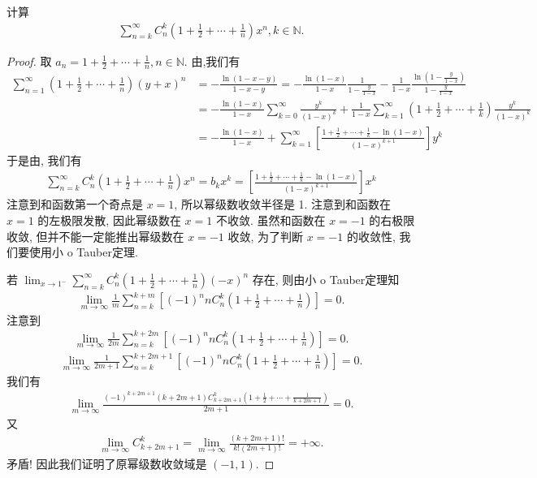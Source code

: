 \documentclass[../../main.tex]{subfiles}
\begin{document}
\begin{example}
计算
\begin{align*}
\sum_{n=k}^{\infty} C_n^k \left(1 + \frac{1}{2} + \cdots + \frac{1}{n}\right) x^n, k \in \mathbb{N}. 
\end{align*}
\end{example}
\begin{proof}
取 $a_n = 1 + \frac{1}{2} + \cdots + \frac{1}{n}, n \in \mathbb{N}$. 由,我们有
\begin{align*}
\sum_{n=1}^{\infty} \left(1 + \frac{1}{2} + \cdots + \frac{1}{n}\right) (y + x)^n &= -\frac{\ln(1 - x - y)}{1 - x - y} = -\frac{\ln(1 - x)}{1 - x} \frac{1}{1 - \frac{y}{1 - x}} - \frac{1}{1 - x} \frac{\ln\left(1 - \frac{y}{1 - x}\right)}{1 - \frac{y}{1 - x}} \\
&= -\frac{\ln(1 - x)}{1 - x} \sum_{k=0}^{\infty} \frac{y^k}{(1 - x)^k} + \frac{1}{1 - x} \sum_{k=1}^{\infty} \left(1 + \frac{1}{2} + \cdots + \frac{1}{k}\right) \frac{y^k}{(1 - x)^k} \\
&= -\frac{\ln(1 - x)}{1 - x} + \sum_{k=1}^{\infty} \left[\frac{1 + \frac{1}{2} + \cdots + \frac{1}{k} - \ln(1 - x)}{(1 - x)^{k + 1}}\right] y^k
\end{align*}
于是由, 我们有
\begin{align*}
\sum_{n=k}^{\infty} C_n^k \left(1 + \frac{1}{2} + \cdots + \frac{1}{n}\right) x^n = b_k x^k = \left[\frac{1 + \frac{1}{2} + \cdots + \frac{1}{k} - \ln(1 - x)}{(1 - x)^{k + 1}}\right] x^k 
\end{align*}
注意到和函数第一个奇点是 $x = 1$, 所以幂级数收敛半径是 1. 注意到和函数在 $x = 1$ 的左极限发散, 因此幂级数在 $x = 1$ 不收敛. 虽然和函数在 $x = -1$ 的右极限收敛, 但并不能一定能推出幂级数在 $x = -1$ 收敛, 为了判断 $x = -1$ 的收敛性, 我们要使用小 o Tauber定理.

若 $\lim_{x \to 1^-} \sum_{n=k}^{\infty} C_n^k \left(1 + \frac{1}{2} + \cdots + \frac{1}{n}\right) (-x)^n$ 存在, 则由小 o Tauber定理知
\begin{align*}
\lim_{m \to \infty} \frac{1}{m} \sum_{n=k}^{k + m} \left[(-1)^n n C_n^k \left(1 + \frac{1}{2} + \cdots + \frac{1}{n}\right)\right] = 0 .
\end{align*}
注意到
\begin{align*}
\lim_{m \to \infty} \frac{1}{2m} \sum_{n=k}^{k + 2m} \left[(-1)^n n C_n^k \left(1 + \frac{1}{2} + \cdots + \frac{1}{n}\right)\right] = 0.
\end{align*}
\begin{align*}
\lim_{m \to \infty} \frac{1}{2m + 1} \sum_{n=k}^{k + 2m + 1} \left[(-1)^n n C_n^k \left(1 + \frac{1}{2} + \cdots + \frac{1}{n}\right)\right] = 0 .
\end{align*}
我们有
\begin{align*}
\lim_{m \to \infty} \frac{(-1)^{k + 2m + 1} (k + 2m + 1) C_{k + 2m + 1}^k \left(1 + \frac{1}{2} + \cdots + \frac{1}{k + 2m + 1}\right)}{2m + 1} = 0.
\end{align*}
又
\begin{align*}
\lim_{m \to \infty} C_{k + 2m + 1}^k = \lim_{m \to \infty} \frac{(k + 2m + 1)!}{k! (2m + 1)!} = +\infty .
\end{align*}
矛盾! 因此我们证明了原幂级数收敛域是 $(-1, 1)$.

\end{proof}
\end{document}
